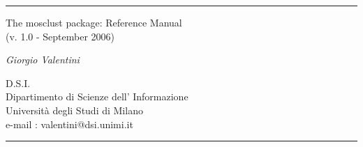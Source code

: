 \documentclass{article}
\begin{document}
\thispagestyle{empty}

\noindent
\rule[6mm]{12.3cm}{0.5mm}


\vspace{0.5cm}
\begin{center}
\begin{minipage}{0.8\textwidth}

{\LARGE
The mosclust package: Reference Manual}\\

\noindent
\vspace{0.5 cm}
(v. 1.0 - September 2006)

\vspace{0.6cm}
{\large \em   Giorgio Valentini}

{ D.S.I. \\
Dipartimento di Scienze dell' Informazione \\
Universit\`a degli Studi di Milano\\
e-mail : valentini@dsi.unimi.it}
\end{minipage}
\end{center}

\vspace{0.5cm}
\noindent
\rule[6mm]{12.3cm}{0.5mm}

\newpage

\clearpage
\end{document}
